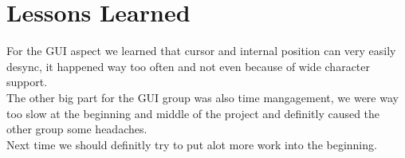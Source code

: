 \section{Lessons Learned}\label{sec:lessons}
For the GUI aspect we learned that cursor and internal position can very easily desync, it happened way too often and not even because of wide character support.
\\The other big part for the GUI group was also time mangagement, we were way too slow at the beginning and middle of the project and definitly caused the other group some headaches.
\\Next time we should definitly try to put alot more work into the beginning.